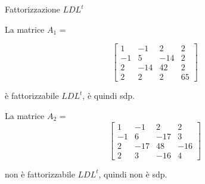 Fattorizzazione $LDL^t$




La matrice $A_1$ = 

\[\begin{bmatrix}
	1  & -1  & 2   & 2  \\ 
	-1 & 5   & -14 & 2  \\
	2  & -14 & 42  & 2  \\
	2  & 2   & 2   & 65 
\end{bmatrix}\]

è fattorizzabile $LDL^t$, è quindi sdp.

La matrice $A_2$ = 
\[\begin{bmatrix}
	1  & -1  & 2   & 2   \\ 
	-1 & 6   & -17 & 3   \\
	2  & -17 & 48  & -16 \\
	2  & 3   & -16 & 4   
\end{bmatrix}\]

non è fattorizzabile $LDL^t$, quindi non è sdp.